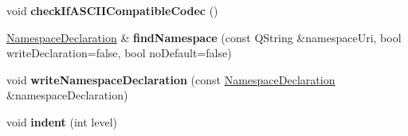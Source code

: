 \begin{DoxyCompactItemize}
\mbox{\label{class_xml_stream_writer_private_a4008c9dd4e8ee861291e51fd177af149}} 
void {\bfseries check\+If\+A\+S\+C\+I\+I\+Compatible\+Codec} ()
\item 
\mbox{\label{class_xml_stream_writer_private_a90ee3d6fc64617ae079f683a8b526f9e}} 
\hyperlink{struct_xml_stream_private_tag_stack_1_1_namespace_declaration}{Namespace\+Declaration} \& {\bfseries find\+Namespace} (const Q\+String \&namespace\+Uri, bool write\+Declaration=false, bool no\+Default=false)
\item 
\mbox{\label{class_xml_stream_writer_private_a75fdceac6768ef04a9dd3722419394e6}} 
void {\bfseries write\+Namespace\+Declaration} (const \hyperlink{struct_xml_stream_private_tag_stack_1_1_namespace_declaration}{Namespace\+Declaration} \&namespace\+Declaration)
\item 
\mbox{\label{class_xml_stream_writer_private_a9ac64546fc92df470de195dab759af18}} 
void {\bfseries indent} (int level)
\end{DoxyCompactItemize}
